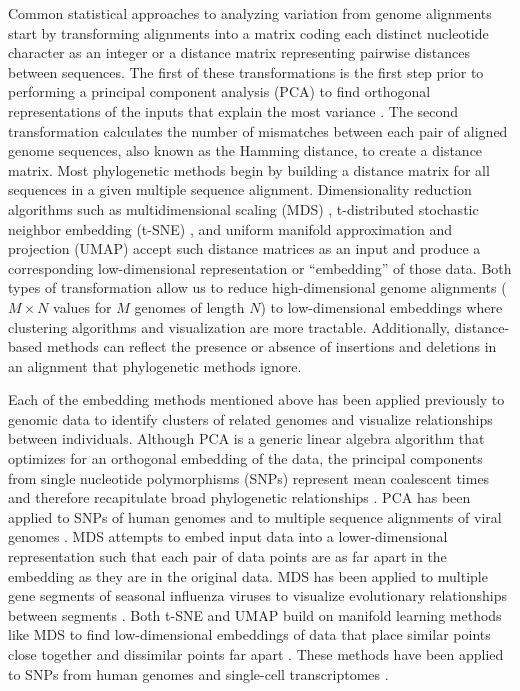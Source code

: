 \documentclass[10pt,letterpaper]{article}
\begin{document}
Common statistical approaches to analyzing variation from genome alignments start by transforming alignments into a matrix coding each distinct nucleotide character as an integer or a distance matrix representing pairwise distances between sequences.
The first of these transformations is the first step prior to performing a principal component analysis (PCA) to find orthogonal representations of the inputs that explain the most variance \cite{jolliffe_cadima_2016}.
The second transformation calculates the number of mismatches between each pair of aligned genome sequences, also known as the Hamming distance, to create a distance matrix.
Most phylogenetic methods begin by building a distance matrix for all sequences in a given multiple sequence alignment.
Dimensionality reduction algorithms such as multidimensional scaling (MDS) \cite{hout_papesh_goldinger_2012}, t-distributed stochastic neighbor embedding (t-SNE) \cite{maaten2008visualizing}, and uniform manifold approximation and projection (UMAP) \cite{lel2018umap} accept such distance matrices as an input and produce a corresponding low-dimensional representation or ``embedding'' of those data.
Both types of transformation allow us to reduce high-dimensional genome alignments ($M \times N$ values for $M$ genomes of length $N$) to low-dimensional embeddings where clustering algorithms and visualization are more tractable.
Additionally, distance-based methods can reflect the presence or absence of insertions and deletions in an alignment that phylogenetic methods ignore.

Each of the embedding methods mentioned above has been applied previously to genomic data to identify clusters of related genomes and visualize relationships between individuals.
Although PCA is a generic linear algebra algorithm that optimizes for an orthogonal embedding of the data, the principal components from single nucleotide polymorphisms (SNPs) represent mean coalescent times and therefore recapitulate broad phylogenetic relationships \cite{mcvean_2009}.
PCA has been applied to SNPs of human genomes \cite{novembre_2008,alexander_2009,mcvean_2009,auton_2015} and to multiple sequence alignments of viral genomes \cite{metsky_2017}.
MDS attempts to embed input data into a lower-dimensional representation such that each pair of data points are as far apart in the embedding as they are in the original data.
MDS has been applied to multiple gene segments of seasonal influenza viruses to visualize evolutionary relationships between segments \cite{rambaut_2008}.
Both t-SNE and UMAP build on manifold learning methods like MDS to find low-dimensional embeddings of data that place similar points close together and dissimilar points far apart \cite{kobak_2021}.
These methods have been applied to SNPs from human genomes \cite{diaz-papkovich_2019} and single-cell transcriptomes \cite{becht_2018,kobak_2019}.
\end{document}
